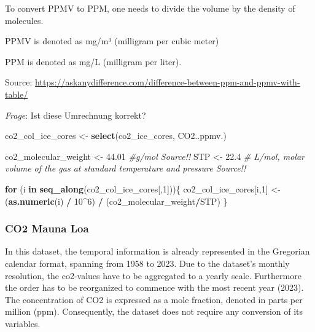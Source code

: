 \documentclass[
]{article}
\newenvironment{Shaded}{\begin{snugshade}}{\end{snugshade}}
\newcommand{\CommentTok}[1]{\textcolor[rgb]{0.56,0.35,0.01}{\textit{#1}}}
\newcommand{\ControlFlowTok}[1]{\textcolor[rgb]{0.13,0.29,0.53}{\textbf{#1}}}
\newcommand{\DecValTok}[1]{\textcolor[rgb]{0.00,0.00,0.81}{#1}}
\newcommand{\FloatTok}[1]{\textcolor[rgb]{0.00,0.00,0.81}{#1}}
\newcommand{\FunctionTok}[1]{\textcolor[rgb]{0.13,0.29,0.53}{\textbf{#1}}}
\newcommand{\NormalTok}[1]{#1}
\newcommand{\OtherTok}[1]{\textcolor[rgb]{0.56,0.35,0.01}{#1}}
\newcommand{\SpecialCharTok}[1]{\textcolor[rgb]{0.81,0.36,0.00}{\textbf{#1}}}
\begin{document}
To convert PPMV to PPM, one needs to divide the volume by the density of
molecules.

PPMV is denoted as mg/m³ (milligram per cubic meter)

PPM is denoted as mg/L (milligram per liter).

Source:
\url{https://askanydifference.com/difference-between-ppm-and-ppmv-with-table/}

\emph{Frage}: Ist diese Umrechnung korrekt?

\begin{Shaded}
\begin{Highlighting}[]
\NormalTok{co2\_col\_ice\_cores }\OtherTok{\textless{}{-}} \FunctionTok{select}\NormalTok{(co2\_ice\_cores, CO2..ppmv.)}

\NormalTok{co2\_molecular\_weight }\OtherTok{\textless{}{-}} \FloatTok{44.01} \CommentTok{\#g/mol Source!!}
\NormalTok{STP }\OtherTok{\textless{}{-}} \FloatTok{22.4} \CommentTok{\# L/mol, molar volume of the gas at standard temperature and pressure Source!!}

\ControlFlowTok{for}\NormalTok{ (i }\ControlFlowTok{in} \FunctionTok{seq\_along}\NormalTok{(co2\_col\_ice\_cores[,}\DecValTok{1}\NormalTok{]))\{}
\NormalTok{  co2\_col\_ice\_cores[i,}\DecValTok{1}\NormalTok{] }\OtherTok{\textless{}{-}}\NormalTok{ (}\FunctionTok{as.numeric}\NormalTok{(i) }\SpecialCharTok{/} \DecValTok{10}\SpecialCharTok{\^{}}\DecValTok{6}\NormalTok{) }\SpecialCharTok{/}\NormalTok{ (co2\_molecular\_weight}\SpecialCharTok{/}\NormalTok{STP)}
\NormalTok{\}}
\end{Highlighting}
\end{Shaded}

\hypertarget{co2-mauna-loa}{%
\subsubsection{CO2 Mauna Loa}\label{co2-mauna-loa}}

In this dataset, the temporal information is already represented in the
Gregorian calendar format, spanning from 1958 to 2023. Due to the
dataset's monthly resolution, the co2-values have to be aggregated to a
yearly scale. Furthermore the order has to be reorganized to commence
with the most recent year (2023). The concentration of CO2 is expressed
as a mole fraction, denoted in parts per million (ppm). Consequently,
the dataset does not require any conversion of its variables.
\end{document}
